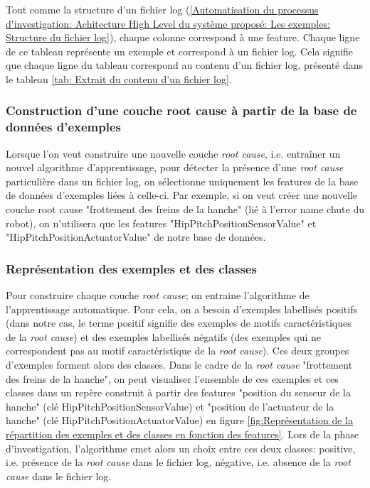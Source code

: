 Tout comme la structure d'un fichier log (\ref{Automatisation du processus d'investigation: Achitecture High Level du système proposé: Les exemples: Structure du fichier log}), chaque colonne correspond à une feature. Chaque ligne de ce tableau représente un exemple et correspond à un fichier log. Cela signifie que chaque ligne du tableau correspond au contenu d'un fichier log, présenté dans le tableau \ref {tab: Extrait du contenu d'un fichier log}.

\subsubsection{Construction d'une couche root cause à partir de la base de données d'exemples}
\label{Automatisation du processus d'investigation: Achitecture High Level du système proposé: Les exemples: Construction d'une couche root cause à partir de la base de données d'exemples}
Lorsque l'on veut construire une nouvelle couche \emph{root cause}, i.e. entraîner un nouvel algorithme d'apprentissage, pour détecter la présence d'une \emph{root cause} particulière dans un fichier log, on sélectionne uniquement les features de la base de données d'exemples liées à celle-ci. Par exemple, si on veut créer une nouvelle couche root cause "frottement des freins de la hanche" (lié à l'error name chute du robot), on n'utilisera que les features "HipPitchPositionSensorValue" et "HipPitchPositionActuatorValue" de notre base de données.

\subsubsection{Représentation des exemples et des classes}
\label{Automatisation du processus d'investigation: Achitecture High Level du système proposé: Les exemples: Représentation des exemples et des classes}
Pour construire chaque couche \emph{root cause}; on entraine l'algorithme de l'apprentissage automatique. Pour cela, on a besoin d'exemples labellisés positifs (dans notre cas, le terme positif signifie des exemples de motifs caractéristiques de la \emph{root cause}) et des exemples labellisés négatifs (des exemples qui ne correspondent pas au motif caractéristique de la \emph{root cause}). Ces deux groupes d'exemples forment alors des classes. Dans le cadre de la \emph{root cause} "frottement des freins de la hanche", on peut visualiser l'ensemble de ces exemples et ces classes dans un repère construit à partir des features "position du senseur de la hanche" (clé HipPitchPositionSensorValue) et "position de l'actuateur de la hanche" (clé HipPitchPositionActuatorValue) en figure 	\ref{fig:Représentation de la répartition des exemples et des classes en fonction des features}. Lors de la phase d'investigation, l'algorithme emet alors un choix entre ces deux classes: positive, i.e. présence de la \emph{root cause} dans le fichier log, négative, i.e. absence de la \emph{root cause} dans le fichier log. 

